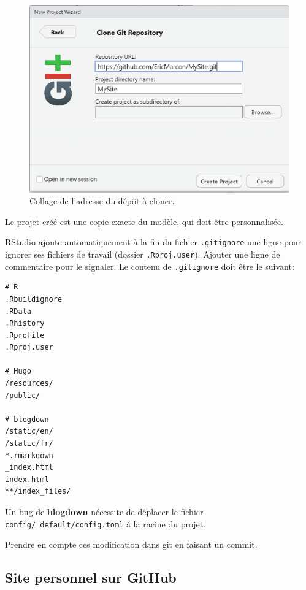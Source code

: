 \documentclass[
  12pt,
  french,
  a4paper,
  extrafontsizes,onecolumn,openright
  ]{memoir}
\begin{document}
\scriptsize

\begin{figure}

{\centering \includegraphics[width=0.8\linewidth]{images/rediger-Projet-GitHub} 

}

\caption{Collage de l'adresse du dépôt à cloner.}\label{fig:rediger-Projet-GitHub}
\end{figure}

\normalsize

Le projet créé est une copie exacte du modèle, qui doit être personnalisée.

RStudio ajoute automatiquement à la fin du fichier \texttt{.gitignore} une ligne pour ignorer ses fichiers de travail (dossier \texttt{.Rproj.user}).
Ajouter une ligne de commentaire pour le signaler.
Le contenu de \texttt{.gitignore} doit être le suivant:

\begin{verbatim}
# R
.Rbuildignore
.RData
.Rhistory
.Rprofile
.Rproj.user

# Hugo
/resources/
/public/

# blogdown
/static/en/
/static/fr/
*.rmarkdown
_index.html
index.html
**/index_files/
\end{verbatim}

Un bug de \textbf{blogdown} nécessite de déplacer le fichier \texttt{config/\_default/config.toml} à la racine du projet.

Prendre en compte ces modification dans git en faisant un commit.

\hypertarget{site-personnel-sur-github}{%
\subsection{Site personnel sur GitHub}\label{site-personnel-sur-github}}
\end{document}
